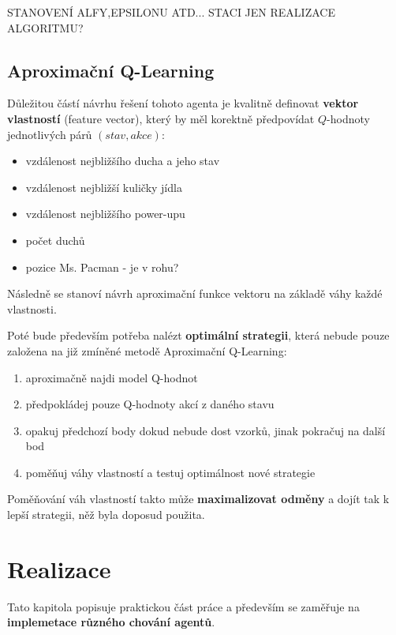 STANOVENÍ ALFY,EPSILONU ATD...
STACI JEN REALIZACE ALGORITMU?
\section{Aproximační Q-Learning}
Důležitou částí návrhu řešení tohoto agenta je kvalitně definovat \textbf{vektor vlastností} (feature vector), který by měl korektně předpovídat $Q$-hodnoty jednotlivých párů $(stav,akce)$:
\begin{itemize}
\item vzdálenost nejbližšího ducha a jeho stav
\item vzdálenost nejbližší kuličky jídla
\item vzdálenost nejbližšího power-upu
\item počet duchů
\item pozice Ms. Pacman - je v rohu?
\end{itemize}
Následně se stanoví návrh aproximační funkce vektoru na základě váhy každé vlastnosti.

Poté bude především potřeba nalézt \textbf{optimální strategii}, která nebude pouze založena na již zmíněné metodě Aproximační Q-Learning:
\begin{enumerate}
\item aproximačně najdi model Q-hodnot
\item předpokládej pouze Q-hodnoty akcí z daného stavu
\item opakuj předchozí body dokud nebude dost vzorků, jinak pokračuj na další bod
\item poměňuj váhy vlastností a testuj optimálnost nové strategie
\end{enumerate}
Poměňování váh vlastností takto může \textbf{maximalizovat odměny} a dojít tak k lepší strategii, něž byla doposud použita.

\chapter{Realizace}
Tato kapitola popisuje praktickou část práce a především se zaměřuje na \textbf{implemetace různého chování agentů}.

